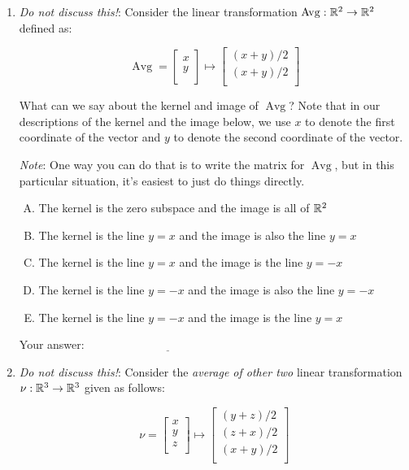 \documentclass[10pt]{amsart}
\begin{document}
\begin{enumerate}

\item {\em Do not discuss this!}: Consider the linear transformation
  $\operatorname{Avg}:\mathbb{R}^2 \to \mathbb{R}^2$ defined as:

  $$\operatorname{Avg} = \left[ \begin{matrix} x \\ y \\\end{matrix}\right] \mapsto \left[ \begin{matrix} (x + y)/2 \\ (x + y)/2 \\\end{matrix}\right]$$

  What can we say about the kernel and image of $\operatorname{Avg}$?
  Note that in our descriptions of the kernel and the image below, we
  use $x$ to denote the first coordinate of the vector and $y$ to
  denote the second coordinate of the vector.

  {\em Note}: One way you can do that is to write the matrix for
  $\operatorname{Avg}$, but in this particular situation, it's easiest
  to just do things directly.

  \begin{enumerate}[(A)]
  \item The kernel is the zero subspace and the image is all of $\mathbb{R}^2$
  \item The kernel is the line $y = x$ and the image is also the line
    $y = x$
  \item The kernel is the line $y = x$ and the image is the line $y =
    -x$
  \item The kernel is the line $y = -x$ and the image is also the line
    $y = -x$
  \item The kernel is the line $y = -x$ and the image is the line $y = x$
  \end{enumerate}

  \vspace{0.1in}
  Your answer: $\underline{\qquad\qquad\qquad\qquad\qquad\qquad\qquad}$
  \vspace{0.1in}

\item {\em Do not discuss this!}: Consider the {\em average of other
  two} linear transformation $\nu:\mathbb{R}^3 \to \mathbb{R}^3$ given as follows:

  $$\nu = \left[ \begin{matrix} x \\ y \\ z \\ \end{matrix}\right] \mapsto \left[ \begin{matrix} (y + z)/2 \\ (z + x)/2 \\ (x + y)/2 \\ \end{matrix} \right]$$


\end{enumerate}
\end{document}

